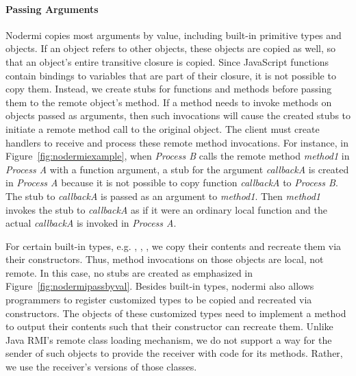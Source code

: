 \nodermipassbyreffig{}


\nodrmipassbyvalfig{}


\paragraph{Passing Arguments}
Nodermi copies most arguments by value, including built-in primitive types
and objects.  If an object refers to other objects, these objects are copied
as well, so that an object's entire transitive closure is copied.
Since JavaScript functions contain bindings to variables that are part of
their closure, it is not possible to copy them.
Instead, we create stubs for functions and methods before passing them
to the remote object's method.  If a method needs to invoke
methods on objects passed as arguments, then such invocations
will cause the created stubs to initiate a remote method
call to the original object.  The client must create handlers
to receive and process these remote method invocations.
For instance, in Figure~\ref{fig:nodermiexample},
when \emph{Process B} calls the remote method \emph{method1}
in \emph{Process A} with a function argument,
a stub for the argument
\emph{callbackA} is created in \emph{Process A} because
it is not possible to copy function \emph{callbackA} to \emph{Process B}.
The stub to \emph{callbackA} is passed as an argument to
 \emph{method1}.
Then \emph{method1} invokes the stub to \emph{callbackA} as if it were an ordinary
 local function and the actual \emph{callbackA} is invoked in \emph{Process A}.


For certain built-in types, e.g. , , ,
we copy their contents and recreate them via their constructors.
Thus, method invocations on those objects are local, not remote.
In this case, no stubs are created as emphasized in Figure~\ref{fig:nodermipassbyval}.
Besides built-in types, nodermi also allows programmers to
register customized types to be copied and recreated via constructors.
The objects of these customized types need to implement a method to output
their contents such that their constructor can recreate them.
Unlike Java RMI\cite{j2eedoc}'s remote class loading mechanism, we do
not support a way for the sender of such objects to provide the receiver
with code for its methods.  Rather, we use the receiver's versions of
those classes.

